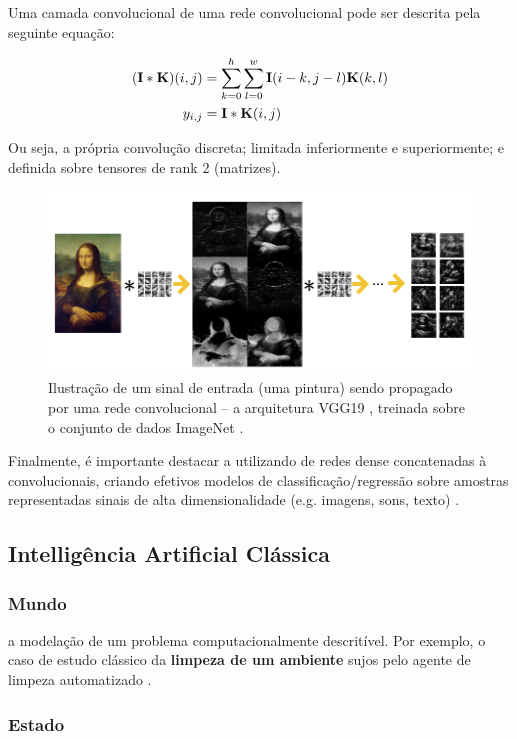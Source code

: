 \documentclass[twoside,conference,a4paper,12px]{IEEEtran}
\begin{document}
Uma camada convolucional de uma rede convolucional pode ser descrita pela seguinte equação:

\begin{align*}
	(\bold I \ast \bold K)(i, j) &= \sum_{k=0}^h \sum_{l=0}^w \bold I (i - k, j -l)\bold K(k, l)\\
	y_{i,j} &= \bold I \ast \bold K(i, j)
\end{align*}

Ou seja, a própria convolução discreta; limitada inferiormente e superiormente; e definida sobre tensores de rank 2 (matrizes).

\begin{figure}[!ht]
	\centering
	\includegraphics[width=.48\textwidth]{assets/cn-base}
	\caption{Ilustração de um sinal de entrada (uma pintura) sendo propagado por uma rede convolucional -- a arquitetura VGG19 \cite{simonyan2014very}, treinada sobre o conjunto de dados ImageNet \cite{ILSVRC15}.}
	\label{fig:cn_base}
\end{figure}

Finalmente, é importante destacar a utilizando de redes dense concatenadas à convolucionais, criando efetivos modelos de classificação/regressão sobre amostras representadas sinais de alta dimensionalidade (e.g. imagens, sons, texto) \cite{krizhevsky2012imagenet, simonyan2014very}.

\subsection{Intelligência Artificial Clássica}

\subsubsection{Mundo}

a modelação de um problema computacionalmente descritível. Por exemplo, o caso de estudo clássico da \textbf{limpeza de um ambiente} sujos pelo agente de limpeza automatizado \cite{russell2003artificial}.

\subsubsection{Estado}
\end{document}

